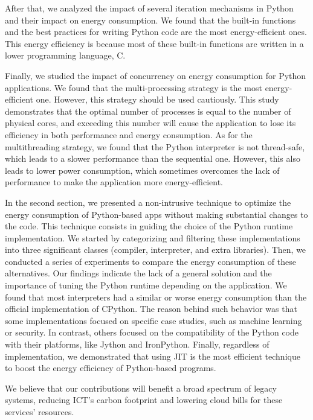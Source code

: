 After that, we analyzed the impact of several iteration mechanisms in Python and their impact on energy consumption.
We found that the built-in functions and the best practices for writing Python code are the most energy-efficient ones.
This energy efficiency is because most of these built-in functions are written in a lower programming language, C.

Finally, we studied the impact of concurrency on energy consumption for Python applications.
We found that the multi-processing strategy is the most energy-efficient one.
However, this strategy should be used cautiously.
This study demonstrates that the optimal number of processes is equal to the number of physical cores, and exceeding this number will cause the application to lose its efficiency in both performance and energy consumption.
As for the multithreading strategy, we found that the Python interpreter is not thread-safe, which leads to a slower performance than the sequential one.
However, this also leads to lower power consumption, which sometimes overcomes the lack of performance to make the application more energy-efficient.

In the second section, we presented a non-intrusive technique to optimize the energy consumption of Python-based apps without making substantial changes to the code.
This technique consists in guiding the choice of the Python runtime implementation.
We started by categorizing and filtering these implementations into three significant classes (compiler, interpreter, and extra libraries).
Then, we conducted a series of experiments to compare the energy consumption of these alternatives.
Our findings indicate the lack of a general solution and the importance of tuning the Python runtime depending on the application.
We found that most interpreters had a similar or worse energy consumption than the official implementation of CPython.
The reason behind such behavior was that some implementations focused on specific case studies, such as machine learning or security.
In contrast, others focused on the compatibility of the Python code with their platforms, like Jython and IronPython.
Finally, regardless of implementation, we demonstrated that using JIT is the most efficient technique to boost the energy efficiency of Python-based programs.

We believe that our contributions will benefit a broad spectrum of legacy systems, reducing ICT's carbon footprint and lowering cloud bills for these services' resources.